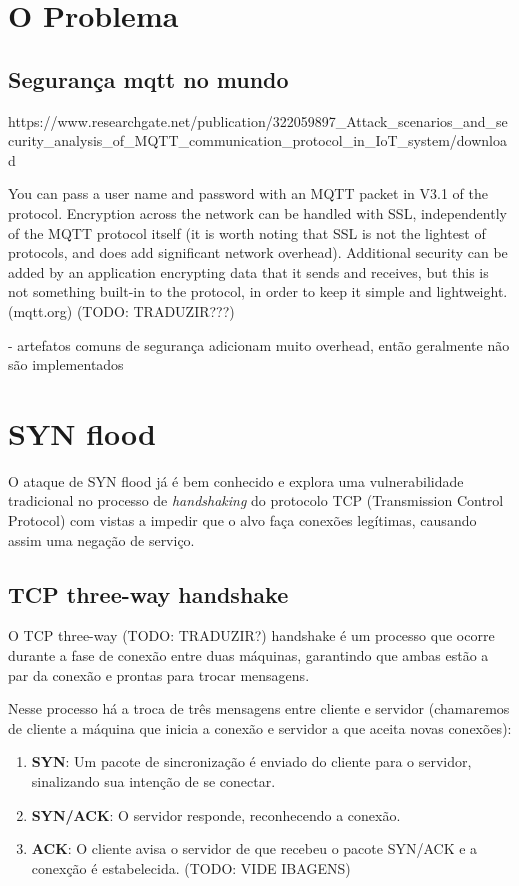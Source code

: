 \section{O Problema}

\subsection{Segurança mqtt no mundo}

https://www.researchgate.net/publication/322059897_Attack_scenarios_and_security_analysis_of_MQTT_communication_protocol_in_IoT_system/download


You can pass a user name and password with an MQTT packet in V3.1 of the protocol. Encryption across the network can be handled with SSL, independently of the MQTT protocol itself (it is worth noting that SSL is not the lightest of protocols, and does add significant network overhead). Additional security can be added by an application encrypting data that it sends and receives, but this is not something built-in to the protocol, in order to keep it simple and lightweight. (mqtt.org)
(TODO: TRADUZIR???)

- artefatos comuns de segurança adicionam muito overhead, então geralmente não são implementados



\section{SYN flood}
O ataque de SYN flood já é bem conhecido e explora uma vulnerabilidade tradicional no processo de \emph{handshaking} do protocolo TCP (Transmission Control Protocol) com vistas a impedir que o alvo faça conexões legítimas, causando assim uma negação de serviço.


\subsection{TCP three-way handshake}
O TCP three-way (TODO: TRADUZIR?) handshake é um processo que ocorre durante a fase de conexão entre duas máquinas, garantindo que ambas estão a par da conexão e prontas para trocar mensagens.

Nesse processo há a troca de três mensagens entre cliente e servidor (chamaremos de cliente a máquina que inicia a conexão e servidor a que aceita novas conexões):



\begin{enumerate}
  \item \textbf{SYN}: Um pacote de sincronização é enviado do cliente para o servidor, sinalizando sua intenção de se conectar.
  \item \textbf{SYN/ACK}: O servidor responde, reconhecendo a conexão.
  \item \textbf{ACK}: O cliente avisa o servidor de que recebeu o pacote SYN/ACK e a conexção é estabelecida.
  (TODO: VIDE IBAGENS)
\end{enumerate}



